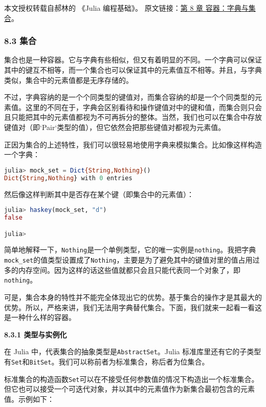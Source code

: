 
本文授权转载自郝林的 《Julia 编程基础》。 原文链接：\href{https://github.com/hyper0x/JuliaBasics/blob/master/book/ch08.md}{第 8 章 容器：字典与集合}。


\subsubsection{8.3 集合}

集合也是一种容器。它与字典有些相似，但又有着明显的不同。一个字典可以保证其中的键互不相等，而一个集合也可以保证其中的元素值互不相等。并且，与字典类似，集合中的元素值都是无序存储的。

不过，字典容纳的是一个个同类型的键值对，而集合容纳的却是一个个同类型的元素值。这里的不同在于，字典会区别看待和操作键值对中的键和值，而集合则只会且只能把其中的元素值都视为不可再拆分的整体。当然，我们也可以在集合中存放键值对（即`Pair`类型的值），但它依然会把那些键值对都视为元素值。

正因为集合的上述特性，我们可以很轻易地使用字典来模拟集合。比如像这样构造一个字典：

\begin{lstlisting}[language=julia]
julia> mock_set = Dict{String,Nothing}()
Dict{String,Nothing} with 0 entries
\end{lstlisting}

然后像这样判断其中是否存在某个键（即集合中的元素值）：

\begin{lstlisting}[language=julia]
julia> haskey(mock_set, "d")
false

julia> 
\end{lstlisting}

简单地解释一下，\verb`Nothing`是一个单例类型，它的唯一实例是\verb`nothing`。我把字典\verb`mock_set`的值类型设置成了\verb`Nothing`，主要是为了避免其中的键值对里的值占用过多的内存空间。因为这样的话这些值就都只会且只能代表同一个对象了，即\verb`nothing`。

可是，集合本身的特性并不能完全体现出它的优势。基于集合的操作才是其最大的优势。所以，严格来讲，我们无法用字典替代集合。下面，我们就来一起看一看这是一种什么样的容器。

\textbf{8.3.1 类型与实例化}

在 Julia 中，代表集合的抽象类型是\verb`AbstractSet`。Julia 标准库里还有它的子类型有\verb`Set`和\verb`BitSet`。我们可以称前者为标准集合，称后者为位集合。

标准集合的构造函数\verb`Set`可以在不接受任何参数值的情况下构造出一个标准集合。但它也可以接受一个可迭代对象，并以其中的元素值作为新集合最初包含的元素值。示例如下：

